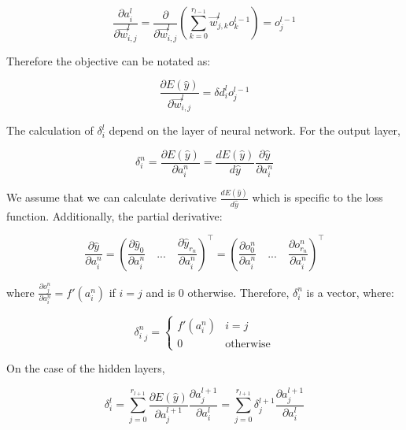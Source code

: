 \documentclass[12pt,a4paper,]{report}
\begin{document}
\begin{equation}
    \frac{\partial a^l_i}{\partial \vec{w}^l_{i, j}} 
    = \frac{\partial}{\partial \vec{w}^l_{i, j}} (\sum_{k=0}^{r_{l-1}} \vec{w}^{l}_{j, k} o^{l-1}_k)
    = o^{l-1}_j
\end{equation}

Therefore the objective can be notated as:

\begin{equation}
\frac{\partial E(\hat{y})}{\partial \vec{w}^l_{i, j}} = \delta{d^l_i} o^{l-1}_j \label{eq:grad}
\end{equation}

The calculation of \(\delta^l_i\) depend on the layer of neural network.
For the output layer,

\begin{equation}
    \delta^n_i = \frac{\partial E(\hat{y})}{\partial a^n_i} = \frac{d E(\hat{y})}{d \hat{y}} \frac{\partial \hat{y}}{\partial a^n_i}
\end{equation}

We assume that we can calculate derivative
\(\frac{d E(\hat{y})}{d \hat{y}}\) which is specific to the loss
function. Additionally, the partial derivative:

\begin{equation}
\frac{\partial \hat{y}}{\partial a^n_i} 
= (\frac{\partial \hat{y}_0}{\partial a^n_i} \quad ... \quad \frac{\partial \hat{y}_{r_n}}{\partial a^n_i})^\intercal
= (\frac{\partial o^n_0}{\partial a^n_i} \quad ... \quad \frac{\partial o^n_{r_n}}{\partial a^n_i})^\intercal
\end{equation}

where \(\frac{\partial o^n_j}{\partial a^n_i} = f'(a^n_i)\) if \(i = j\)
and is 0 otherwise. Therefore, \(\delta^n_i\) is a vector, where:

\begin{equation}
    {\delta^n_i}_{j} = \begin{cases}
        f'(a^n_i) & i = j \\
        0 & \text{otherwise}
    \end{cases} \label{eq:bp_output}
\end{equation}

On the case of the hidden layers,

\begin{equation}
    \delta^l_i
    = \sum_{j=0}^{r_{l+1}} \frac{\partial E(\hat{y})}{\partial a^{l+1}_j} \frac{\partial a^{l+1}_j}{\partial a^{l}_i} 
    = \sum_{j=0}^{r_{l+1}} \delta^{l+1}_j \frac{\partial a^{l+1}_j}{\partial a^{l}_i}
\end{equation}
\end{document}
